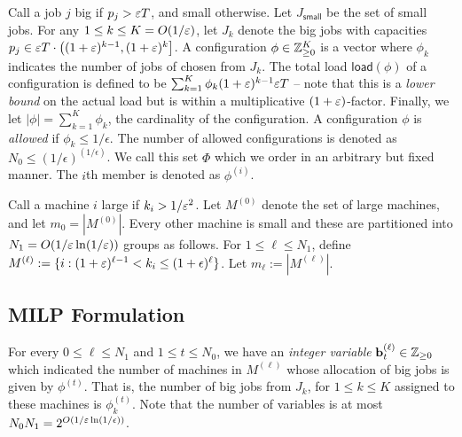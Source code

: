 \documentclass{article}[11pt]
\def\pv{\mathbf{b}}
\newcommand{\dem}{\mathsf{load}}
\begin{document}
\def\sm{\mathsf{small}}
Call a job $j$ big if $p_j > \varepsilon T$, and small otherwise. Let $J_\sm$ 	be the set of small jobs.
For any $1\leq k\leq K = O(1/\varepsilon)$, let $J_k$ denote the big jobs with capacities $p_j \in \varepsilon T\cdot \left((1+\varepsilon)^{k-1},(1+\varepsilon)^k\right]$.
A configuration $\phi \in {\mathbb Z}^K_{\ge 0}$ is a vector where $\phi_k$ indicates the number of jobs of chosen from $J_k$. The total load $\dem(\phi)$ of a configuration is defined to be $\sum_{k=1}^K \phi_k (1+\varepsilon)^{k-1}\varepsilon T$ -- note that this is a {\em lower bound} on the actual load but is within a multiplicative $(1+\varepsilon)$-factor. Finally, we let $|\phi| = \sum_{k=1}^K \phi_k$, the cardinality of the configuration. A configuration $\phi$ is {\em allowed} if $\phi_k \leq 1/\epsilon$. The number of allowed configurations is denoted as $N_0 \leq (1/\epsilon)^{(1/\epsilon)}$.
We call this set $\Phi$ which we order in an arbitrary but fixed manner. The $i$th member is denoted as $\phi^{(i)}$.

\smallskip
Call a machine $i$ large if $k_i > 1/\varepsilon^2$. Let $M^{(0)}$ denote the set of large machines, and let $m_0 = |M^{(0)}|$. 
Every other machine is small and these are partitioned into $N_1 = O(1/\varepsilon \ln(1/\varepsilon))$ groups as follows. For $1\leq \ell \leq N_1$, define 
$M^{(\ell)} := \{i: (1+\varepsilon)^{\ell-1} < k_i \leq (1+\epsilon)^\ell\}$. Let $m_\ell := |M^{(\ell)}|$.

\subsection{MILP Formulation}
For every $0\leq \ell\leq N_1$ and $1\le t\le N_0$, we have an {\em integer variable} $\pv^{(\ell)}_t \in \Z_{\geq 0}$ which indicated the number of machines in $M^{(\ell)}$ whose allocation of big jobs is given by $\phi^{(t)}$.
That is, the number of big jobs from $J_k$, for $1\le k\le K$ assigned to these machines is $\phi^{(t)}_k$. Note that the number of variables is at most $N_0 N_1 = 2^{O(1/\varepsilon \ln(1/\epsilon))}$.
\end{document}
